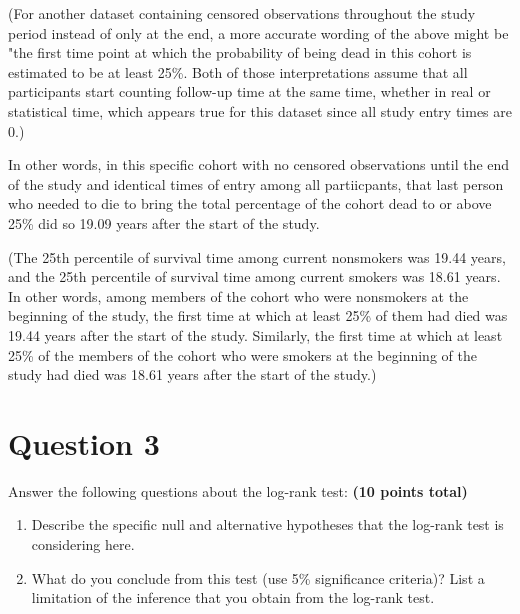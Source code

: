 \documentclass{article}\usepackage[]{graphicx}\usepackage[]{color}
\newif\ifdraft  %
\begin{document}
\vspace{2mm}

(For another dataset containing censored observations throughout the study period instead of only at the end, a more accurate wording of the above might be "the first time point at which the probability of being dead in this cohort is estimated to be at least 25\%.  Both of those interpretations assume that all participants start counting follow-up time at the same time, whether in real or statistical time, which appears true for this dataset since all study entry times are 0.)

\vspace{2mm}

In other words, in this specific cohort with no censored observations until the end of the study and identical times of entry among all partiicpants, that last person who needed to die to bring the total percentage of the cohort dead to or above 25\% did so 19.09 years after the start of the study.

\vspace{2mm}

(The 25th percentile of survival time among current nonsmokers was 19.44 years, and the 25th percentile of survival time among current smokers was 18.61 years.  In other words, among members of the cohort who were nonsmokers at the beginning of the study, the first time at which at least 25\% of them had died was 19.44 years after the start of the study.  Similarly, the first time at which at least 25\% of the members of the cohort who were smokers at the beginning of the study had died was 18.61 years after the start of the study.)








\pagebreak

\section*{Question 3}

\ifdraft

Answer the following questions about the log-rank test: \textbf{(10 points total)}
  \begin{enumerate}
    \item Describe the specific null and alternative hypotheses that the log-rank test is considering here.
    \item What do you conclude from this test (use 5\% significance criteria)? List a limitation of the inference that you obtain from the log-rank test.
  \end{enumerate}
\end{document}
